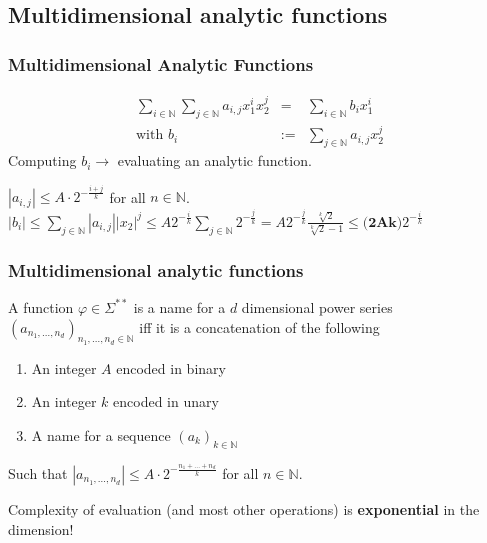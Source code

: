 \documentclass[xcolor=pdftex,dvipsnames,table]{beamer}
\newcommand{\N}{\ensuremath{\mathbb{N}}}
\newcommand{\sigmas}{\ensuremath{\Sigma^{**}}}
\newcommand{\abs}[1]{\left|#1\right|}
\begin{document}
\subsection{Multidimensional analytic functions}
\begin{frame}
  \frametitle{Multidimensional Analytic Functions}
  \begin{tcolorbox}[colback=yellow!5,title=Multidimensional Power Series,colframe=green!75!black]
    \begin{eqnarray*}
      \sum_{i \in \N} \sum_{j \in \N} a_{i,j} x_1^{i} x_2^{j} & = & \sum_{i \in \N} b_i x_1^{i} \\
      \text{with }
      b_i &:=& \sum_{j \in \N} a_{i,j}x_2^j
    \end{eqnarray*}
    Computing $b_i \rightarrow $ evaluating an analytic function.
\end{tcolorbox}
  \pause
  $\abs{a_{i,j}} \leq A \cdot 2^{-\frac{i+j}{k}}$ for all $n \in \N$. \\
  $\abs{b_i} \leq \sum_{j \in \N} \abs{a_{i,j}}\abs{x_2}^j \leq A2^{-\frac{i}{k}} \sum_{j \in \N} 2^{-\frac{j}{k}} = A2^{-\frac{j}{k}}\frac{\sqrt[k]{2}}{\sqrt[k]{2}-1} \leq \textbf{(2Ak)}2^{-\frac{i}{k}}   $
  \end{frame}
\begin{frame}
  \frametitle{Multidimensional analytic functions}
   \begin{tcolorbox}[colback=yellow!5,title=Representation,colframe=blue!75!black]
  A function $\varphi \in \sigmas$ is a name for a $d$ dimensional power series $(a_{n_1,\dots,n_d})_{n_1,\dots,n_d \in \N}$ iff it is a concatenation of the following
  \begin{enumerate}
  \item An integer $A$ encoded in binary
  \item An integer $k$ encoded in unary
  \item A name for a sequence $(a_k)_{k \in \N}$
  \end{enumerate}
  Such that $\abs{a_{n_1,\dots,n_d}} \leq A \cdot 2^{-\frac{n_1+\dots+n_d}{k}}$ for all $n \in \N$.
\end{tcolorbox}
   \pause
  \begin{tcolorbox}[colback=yellow!5,title=Note,colframe=red!75!black]
    Complexity of evaluation (and most other operations) is \textbf{exponential} in the dimension!
  \end{tcolorbox}
  \end{frame}
\end{document}
